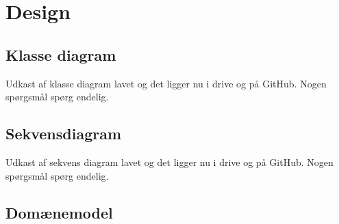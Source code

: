 \section{Design}

\subsection{Klasse diagram}
    Udkast af klasse diagram lavet og det ligger nu i drive og på GitHub. 
    Nogen spørgsmål spørg endelig.
    

\subsection{Sekvensdiagram}
    Udkast af sekvens diagram lavet og det ligger nu i drive og på GitHub. 
    Nogen spørgsmål spørg endelig.

\subsection{Domænemodel}